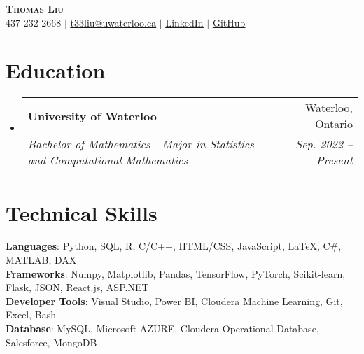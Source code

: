 \documentclass[letterpaper,11pt]{article}
\makeatletter
\newcommand{\resumeSubheading}[4]{
  \vspace{-2pt}\item
    \begin{tabular*}{0.97\textwidth}[t]{l@{\extracolsep{\fill}}r}
      \textbf{#1} & #2 \\
      \textit{\small#3} & \textit{\small #4} \\
    \end{tabular*}\vspace{-7pt}
}
\newcommand{\resumeSubHeadingListStart}{\begin{itemize}[leftmargin=0.15in, label={}]}
\newcommand{\resumeSubHeadingListEnd}{\end{itemize}}
\makeatother
\begin{document}
\begin{center}
    \textbf{\Huge \scshape Thomas Liu} \\ \vspace{1pt}
    \small 437-232-2668 $|$ \href{t33liu@uwaterloo.ca}{\underline{t33liu@uwaterloo.ca}} $|$ 
    \faLinkedinSquare \href{https://www.linkedin.com/in/thomas-tian-yu-liu-a93206236/}{\underline{LinkedIn}} $|$
    \faGithub \href{https://github.com/ThomasLiuuu}{\underline{GitHub}}
\end{center}

\section{Education}
  \resumeSubHeadingListStart
    \resumeSubheading 
      {University of Waterloo}{Waterloo, Ontario}
      {Bachelor of Mathematics - Major in Statistics and Computational Mathematics}{Sep. 2022 -- Present}
  \resumeSubHeadingListEnd

\section{Technical Skills}
 \begin{itemize}[leftmargin=0.15in, label={}]
    \small{\item{
     \textbf{Languages}{: Python, SQL, R, C/C++, HTML/CSS, JavaScript, LaTeX, C\#, MATLAB, DAX} \\
     \textbf{Frameworks}{: Numpy, Matplotlib, Pandas, TensorFlow, PyTorch, Scikit-learn, Flask, JSON, React.js, ASP.NET} \\
     \textbf{Developer Tools}{: Visual Studio, Power BI, Cloudera Machine Learning, Git, Excel, Bash} \\
     \textbf{Database}{: MySQL, Microsoft AZURE, Cloudera Operational Database, Salesforce, MongoDB}
    }}
 \end{itemize}

\end{document}
